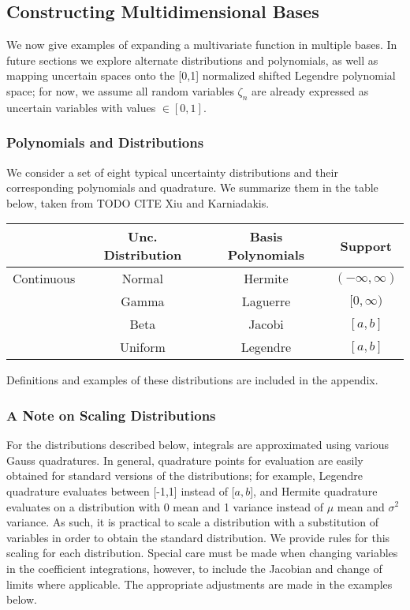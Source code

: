 \subsection{Constructing Multidimensional Bases}
We now give examples of expanding a multivariate function in multiple bases.  In future sections we explore alternate distributions and polynomials, as well as mapping uncertain spaces onto the [0,1] normalized shifted Legendre polynomial space; for now, we assume all random variables $\zeta_n$ are already expressed as uncertain variables with values $\in[0,1]$.

\subsubsection{Polynomials and Distributions}
We consider a set of eight typical uncertainty distributions and their corresponding polynomials and quadrature.  We summarize them in the table below, taken from TODO CITE Xiu and Karniadakis.  
\begin{center}
\begin{tabular}{c|c|c|c}
 & Unc. Distribution & Basis Polynomials & Support \\ \hline\hline
Continuous & Normal & Hermite & $(-\infty,\infty)$ \\
 & Gamma & Laguerre & $[0,\infty)$ \\
 & Beta & Jacobi & $[a,b]$ \\
 & Uniform & Legendre & $[a,b]$
\end{tabular}
\end{center}
Definitions and examples of these distributions are included in the appendix.
\subsubsection{A Note on Scaling Distributions}
For the distributions described below, integrals are approximated using various Gauss quadratures.  In general, quadrature points for evaluation are easily obtained for standard versions of the distributions; for example, Legendre quadrature evaluates between [-1,1] instead of [$a,b$], and Hermite quadrature evaluates on a distribution with 0 mean and 1 variance instead of $\mu$ mean and $\sigma^2$ variance.  As such, it is practical to scale a distribution with a substitution of variables in order to obtain the standard distribution.  We provide rules for this scaling for each distribution.  Special care must be made when changing variables in the coefficient integrations, however, to include the Jacobian and change of limits where applicable.  The appropriate adjustments are made in the examples below.  


